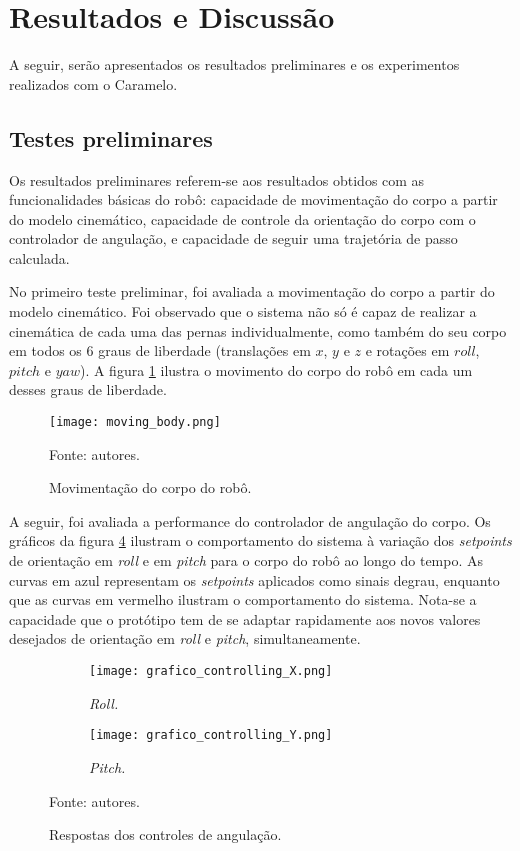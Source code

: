 \documentclass[conference]{IEEEtran}
\begin{document}
\section{Resultados e Discussão}
A seguir, serão apresentados os resultados preliminares e os experimentos realizados com o Caramelo. 
  
  \subsection{Testes preliminares}
  \label{subsec:testes_preliminares}
  
  Os resultados preliminares referem-se aos resultados obtidos com as funcionalidades básicas do robô: capacidade de movimentação do corpo a partir do modelo cinemático, capacidade de controle da orientação do corpo com o controlador de angulação, e capacidade de seguir uma trajetória de passo calculada.

  No primeiro teste preliminar, foi avaliada a movimentação do corpo a partir do modelo cinemático. Foi observado que o sistema não só é capaz de realizar a cinemática de cada uma das pernas individualmente, como também do seu corpo em todos os 6 graus de liberdade (translações em $x$, $y$ e $z$ e rotações em $roll$, $pitch$ e $yaw$). A figura \ref{fig:moving_body} ilustra o movimento do corpo do robô em cada um desses graus de liberdade.
              
  \begin{figure}[!htb]
    \centering
    \texttt{[image: moving\_body.png]}
    \caption{Movimentação do corpo do robô.}
    Fonte: autores.
    \label{fig:moving_body}
  \end{figure}

  A seguir, foi avaliada a performance do controlador de angulação do corpo. Os gráficos da figura \ref{fig:grafico_controlling} ilustram o comportamento do sistema à variação dos \textit{setpoints} de orientação em \textit{roll} e em \textit{pitch} para o corpo do robô ao longo do tempo. As curvas em azul representam os \textit{setpoints} aplicados como sinais degrau, enquanto que as curvas em vermelho ilustram o comportamento do sistema. Nota-se a capacidade que o protótipo tem de se adaptar rapidamente aos novos valores desejados de orientação em \textit{roll} e \textit{pitch}, simultaneamente.

  \begin{figure}
    \centering
    \begin{subfigure}[t]{0.48\textwidth}
      \centering
      \texttt{[image: grafico\_controlling\_X.png]}
      \caption{\textit{Roll.}}
      \label{fig:controlling_roll}
    \end{subfigure}
    \begin{subfigure}[t]{0.48\textwidth}
      \centering
      \texttt{[image: grafico\_controlling\_Y.png]}
      \caption{\textit{Pitch.}}
      \label{fig:controlling_pitch}
    \end{subfigure}
    \caption{Respostas dos controles de angulação.}
    Fonte: autores.
    \label{fig:grafico_controlling}
  \end{figure}
\end{document}
